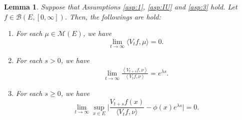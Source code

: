\documentclass[12pt,a4paper]{amsart}
\numberwithin{equation}{section}
\theoremstyle{plain}
\newtheorem{lem}[thm]{Lemma}
\theoremstyle{definition}
\begin{document}
\begin{lem}
\label{lem:asmptotic_of_Vtf}
  Suppose that Assumptions \ref{asp:1}, \ref{asp:IU} and \ref{asp:3} hold. 
  Let $f\in \mathcal B(E, [0,\infty])$.
  Then, the followings are hold:
  \begin{enumerate}
  \item \label{subVtf_vanish}
    For each $\mu \in \mathcal M(E)$, we have
    \[
      \lim_{t\rightarrow\infty}\langle V_tf,\mu\rangle=0.
    \]
   \item \label{lem:extinct_2_1}
For each $s>0$, we have
     \begin{align}
       \lim_{t\to \infty} \frac{\left\langle V_{t+s}f,\nu\right\rangle}{\left\langle V_t f,\nu\right\rangle} 
= e^{\lambda s}.
     \end{align}
  \item \label{lem:extinct:3}
    For each $s\geq 0$, we have
    \begin{equation} \label{eq:ont_point_ratio_limit}
      \lim_{t\to \infty} \sup_{x\in E}\Big|\frac{V_{t+s}f(x)}{\langle V_tf,\nu\rangle } - \phi(x)e^{\lambda s} \Big|
      =0.
    \end{equation}
  \end{enumerate}
\end{lem}
\end{document}
